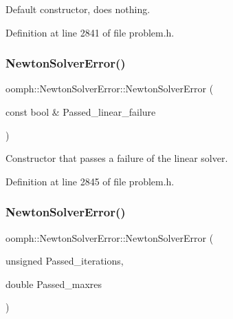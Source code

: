 Default constructor, does nothing. 



Definition at line 2841 of file problem.\+h.

\mbox{\label{classoomph_1_1NewtonSolverError_ae58d468c558b69a3b0a02b8287c7d242}} 
\subsubsection{\texorpdfstring{Newton\+Solver\+Error()}{NewtonSolverError()}\hspace{0.1cm}{\footnotesize\ttfamily [2/3]}}
{\footnotesize\ttfamily oomph\+::\+Newton\+Solver\+Error\+::\+Newton\+Solver\+Error (\begin{DoxyParamCaption}\item[{const bool \&}]{Passed\+\_\+linear\+\_\+failure }\end{DoxyParamCaption})\hspace{0.3cm}{\ttfamily [inline]}}



Constructor that passes a failure of the linear solver. 



Definition at line 2845 of file problem.\+h.

\mbox{\label{classoomph_1_1NewtonSolverError_a13723668ce6a21c38dcd612ee580716b}} 
\subsubsection{\texorpdfstring{Newton\+Solver\+Error()}{NewtonSolverError()}\hspace{0.1cm}{\footnotesize\ttfamily [3/3]}}
{\footnotesize\ttfamily oomph\+::\+Newton\+Solver\+Error\+::\+Newton\+Solver\+Error (\begin{DoxyParamCaption}\item[{unsigned}]{Passed\+\_\+iterations,  }\item[{double}]{Passed\+\_\+maxres }\end{DoxyParamCaption})\hspace{0.3cm}{\ttfamily [inline]}}



